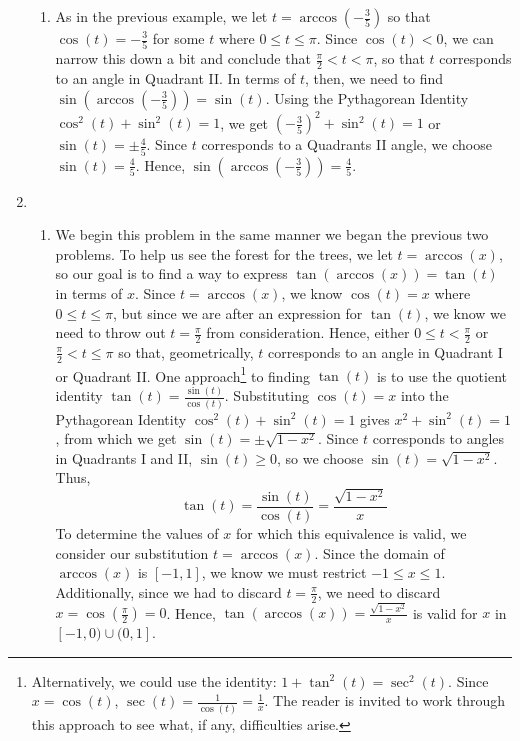 \documentclass[12pt]{ximera}
\begin{document}
\begin{example}
\begin{enumerate}
\begin{enumerate}
\item  As in the previous example, we let $t = \arccos\left(-\frac{3}{5}\right)$ so that  $\cos(t) = -\frac{3}{5}$ for some $t$ where  $0 \leq t \leq \pi$.  Since $\cos(t) < 0$, we can narrow this down a bit and conclude that $\frac{\pi}{2} < t < \pi$, so that $t$ corresponds to an angle in Quadrant II. In terms of $t$, then, we need to find $\sin\left(\arccos\left(-\frac{3}{5}\right)\right) = \sin(t)$.  Using the Pythagorean Identity $\cos^{2}(t) + \sin^{2}(t) = 1$, we get $\left(-\frac{3}{5}\right)^2 + \sin^{2}(t) = 1$ or $\sin(t) = \pm \frac{4}{5}$.  Since $t$ corresponds to a Quadrants II angle, we choose  $\sin(t) = \frac{4}{5}$.  Hence,  $\sin\left(\arccos\left(-\frac{3}{5}\right)\right) = \frac{4}{5}$.

\end{enumerate}

\item

\begin{enumerate}

\item We begin this problem in the same manner we began the previous two problems.  To help us see the forest for the trees, we let  $t = \arccos(x)$, so our goal is to find a way to express $\tan\left(\arccos\left(x \right)\right) = \tan(t)$ in terms of $x$.  Since $t = \arccos(x)$, we know $\cos(t) = x$ where $0 \leq t \leq \pi$, but since we are after an expression for $\tan(t)$, we know we need to throw out $t = \frac{\pi}{2}$ from consideration.  Hence, either $0 \leq t < \frac{\pi}{2}$ or $\frac{\pi}{2} < t \leq \pi$ so that, geometrically, $t$ corresponds to an angle in Quadrant I or Quadrant II.  One approach\footnote{Alternatively, we could use the identity:  $1 + \tan^{2}(t) = \sec^{2}(t)$.  Since $x = \cos(t)$,  $\sec(t) = \frac{1}{\cos(t)} = \frac{1}{x}$.  The reader is invited to work through this approach to see what, if any, difficulties arise.} to finding $\tan(t)$ is to use the quotient identity $\tan(t) = \frac{\sin(t)}{\cos(t)}$.   Substituting $\cos(t) = x$ into the Pythagorean Identity $\cos^{2}(t) + \sin^{2}(t) = 1$ gives $x^2 + \sin^{2}(t) = 1$, from which we get $\sin(t) = \pm \sqrt{1-x^2}$.  Since $t$ corresponds to angles in Quadrants I and II,   $\sin(t) \geq 0$, so we choose $\sin(t) = \sqrt{1-x^2}$.  Thus, \[\tan(t) = \dfrac{\sin(t)}{\cos(t)} = \dfrac{\sqrt{1-x^2}}{x}\]  To determine the values of $x$ for which this equivalence is valid, we consider our substitution $t = \arccos(x)$.  Since the domain of $\arccos(x)$ is $[-1,1]$, we know we must restrict $-1 \leq x \leq 1$.  Additionally, since we had to discard $t = \frac{\pi}{2}$, we need to discard $x = \cos\left(\frac{\pi}{2}\right) = 0$. Hence, $\tan\left(\arccos\left(x \right)\right) =\frac{\sqrt{1-x^2}}{x}$  is valid for $x$ in $[-1,0)\cup(0,1]$.


\end{enumerate}
\end{enumerate}
\end{example}
\end{document}
